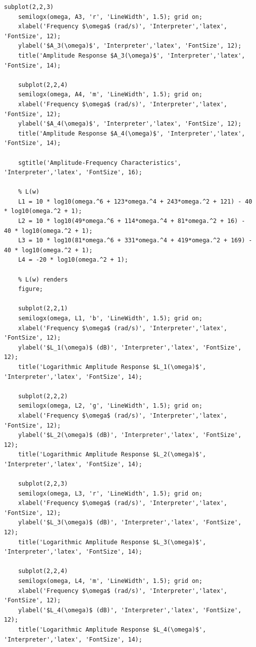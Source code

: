\documentclass[a4paper, 12pt]{article}
\begin{document}
\begin{lstlisting}[label=task1, caption={Программа для задания 1}]
    subplot(2,2,3)
    semilogx(omega, A3, 'r', 'LineWidth', 1.5); grid on;
    xlabel('Frequency $\omega$ (rad/s)', 'Interpreter','latex', 'FontSize', 12);
    ylabel('$A_3(\omega)$', 'Interpreter','latex', 'FontSize', 12);
    title('Amplitude Response $A_3(\omega)$', 'Interpreter','latex', 'FontSize', 14);

    subplot(2,2,4)
    semilogx(omega, A4, 'm', 'LineWidth', 1.5); grid on;
    xlabel('Frequency $\omega$ (rad/s)', 'Interpreter','latex', 'FontSize', 12);
    ylabel('$A_4(\omega)$', 'Interpreter','latex', 'FontSize', 12);
    title('Amplitude Response $A_4(\omega)$', 'Interpreter','latex', 'FontSize', 14);

    sgtitle('Amplitude-Frequency Characteristics', 'Interpreter','latex', 'FontSize', 16);

    % L(w)
    L1 = 10 * log10(omega.^6 + 123*omega.^4 + 243*omega.^2 + 121) - 40 * log10(omega.^2 + 1);
    L2 = 10 * log10(49*omega.^6 + 114*omega.^4 + 81*omega.^2 + 16) - 40 * log10(omega.^2 + 1);
    L3 = 10 * log10(81*omega.^6 + 331*omega.^4 + 419*omega.^2 + 169) - 40 * log10(omega.^2 + 1);
    L4 = -20 * log10(omega.^2 + 1);

    % L(w) renders
    figure;

    subplot(2,2,1)
    semilogx(omega, L1, 'b', 'LineWidth', 1.5); grid on;
    xlabel('Frequency $\omega$ (rad/s)', 'Interpreter','latex', 'FontSize', 12);
    ylabel('$L_1(\omega)$ (dB)', 'Interpreter','latex', 'FontSize', 12);
    title('Logarithmic Amplitude Response $L_1(\omega)$', 'Interpreter','latex', 'FontSize', 14);

    subplot(2,2,2)
    semilogx(omega, L2, 'g', 'LineWidth', 1.5); grid on;
    xlabel('Frequency $\omega$ (rad/s)', 'Interpreter','latex', 'FontSize', 12);
    ylabel('$L_2(\omega)$ (dB)', 'Interpreter','latex', 'FontSize', 12);
    title('Logarithmic Amplitude Response $L_2(\omega)$', 'Interpreter','latex', 'FontSize', 14);

    subplot(2,2,3)
    semilogx(omega, L3, 'r', 'LineWidth', 1.5); grid on;
    xlabel('Frequency $\omega$ (rad/s)', 'Interpreter','latex', 'FontSize', 12);
    ylabel('$L_3(\omega)$ (dB)', 'Interpreter','latex', 'FontSize', 12);
    title('Logarithmic Amplitude Response $L_3(\omega)$', 'Interpreter','latex', 'FontSize', 14);

    subplot(2,2,4)
    semilogx(omega, L4, 'm', 'LineWidth', 1.5); grid on;
    xlabel('Frequency $\omega$ (rad/s)', 'Interpreter','latex', 'FontSize', 12);
    ylabel('$L_4(\omega)$ (dB)', 'Interpreter','latex', 'FontSize', 12);
    title('Logarithmic Amplitude Response $L_4(\omega)$', 'Interpreter','latex', 'FontSize', 14);


\end{lstlisting}
\end{document}
